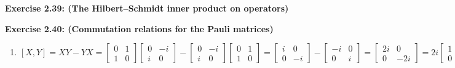 \documentclass{article}
\begin{document}
\bigskip

\begin{framed}
    \noindent \textbf{Exercise 2.39: (The Hilbert–Schmidt inner product on operators)}
    
    \medskip
    
    
\end{framed}

\bigskip

\begin{framed}
    \noindent \textbf{Exercise 2.40: (Commutation relations for the Pauli matrices)}
    
    \medskip
    \begin{enumerate}
        \item $[X, Y] = XY - YX = \begin{bmatrix}0 & 1 \\ 1 & 0 \end{bmatrix}\begin{bmatrix}0 & -i \\ i & 0\end{bmatrix}-\begin{bmatrix}0 & -i \\ i & 0\end{bmatrix}\begin{bmatrix}0 & 1 \\ 1 & 0 \end{bmatrix} = \begin{bmatrix}i & 0 \\ 0 & -i \end{bmatrix}-\begin{bmatrix}-i & 0 \\ 0 & i \end{bmatrix}= \begin{bmatrix}2i & 0 \\ 0 & -2i \end{bmatrix} = 2i\begin{bmatrix}1 & 0 \\ 0 & -1\end{bmatrix} = 2iZ$

\end{enumerate}
\end{framed}
\end{document}
